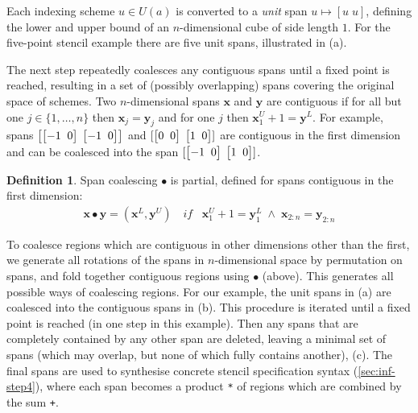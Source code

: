 \documentclass[10pt,preprint]{sigplanconf}
\newcounter{block}
\theoremstyle{definition}
\newtheorem{definition}[block]{Definition}
\newcommand{\vect}[1]{\textbf{#1}}
\newcommand{\vtwoh}[2]{\setlength{\arraycolsep}{0em}
\left[\begin{array}{cc}#1 \; & \; #2\end{array}\right]}
\begin{document}
\noindent
Each indexing scheme $u \in U(a)$ is converted to a \emph{unit} span
$u \mapsto [u \; u]$, defining the lower and upper bound of an
$n$-dimensional cube of side length $1$. For the five-point stencil
example there are five unit spans, illustrated in
(a).

The next step repeatedly coalesces any contiguous spans until a fixed
point is reached, resulting in a set of (possibly overlapping) spans
covering the original space of schemes. Two $n$-dimensional spans
$\vect{x}$ and $\vect{y}$ are contiguous if for all but one
$j \in \{1, \ldots, n\}$ then $\vect{x}_j = \vect{y}_j$ and for one
$j$ then $\vect{x}^U_1 + 1 = \vect{y}^L$. For example, spans
$\left[\vtwoh{-1}{0}\; \vtwoh{-1}{0}\right]$ and
$[\vtwoh{0}{0} \; \vtwoh{1}{0}]$ are contiguous in the first dimension
and can be coalesced into the span $[\vtwoh{-1}{0} \; \vtwoh{1}{0}]$.

\begin{definition}\label{def:span-coalesc}
  Span coalescing $\bullet$ is partial, defined for spans contiguous in the
  first dimension:
\begin{align*}
\vect{x} \bullet \vect{y}
= (\vect{x}^L, \vect{y}^U) \;\;\;\, \textit{if} \;\;\; \vect{x}^U_1 + 1 = \vect{y}^L_1 \; \wedge \;
\vect{x}_{2:n} = \vect{y}_{2:n} %
\end{align*}
\end{definition}
\noindent
To coalesce regions which are contiguous in other dimensions
other than the first, we generate all rotations of the spans in
$n$-dimensional space by permutation on spans, and fold together contiguous
regions using $\bullet$ (above). This
generates all possible ways of coalescing regions. For our example,
the unit spans in (a)
are coalesced into the contiguous spans in
(b).
This procedure is iterated until a fixed point is reached (in one step
in this example).
 Then any spans that are completely contained by any other span are deleted,
leaving a minimal set of spans (which may overlap, but none of which
fully contains another), (c).
The final spans are used to synthesise concrete stencil specification
syntax (\cref{sec:inf-step4}), where
each span becomes a product \texttt{*} of regions which are
combined by the sum \texttt{+}.
\end{document}
